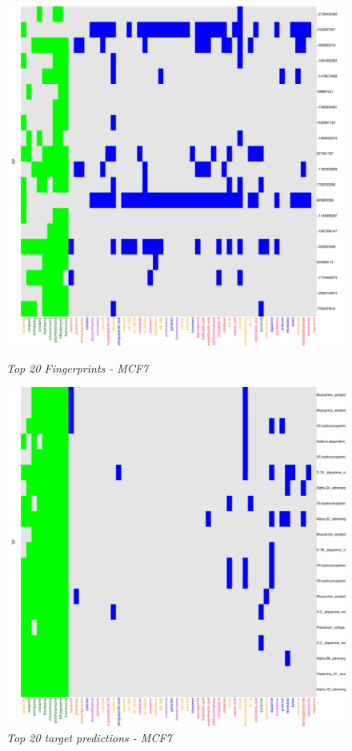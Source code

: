 \documentclass[a4paper]{article}
\begin{document}
\begin{figure}[H]
  \begin{minipage}[b]{.5\linewidth}
     \centering
\includegraphics{IntClustVignette-FeaturesPlotF}
\caption{{\it Top 20 Fingerprints - MCF7}\label{MCF7_F}}
\end{minipage}%
  \begin{minipage}[b]{.5\linewidth}
     \centering
\includegraphics{IntClustVignette-FeaturesPlotT}
\caption{{\it Top 20 target predictions - MCF7}\label{MCF7_F}}
\end{minipage}
\end{figure}
\newpage


\end{document}
